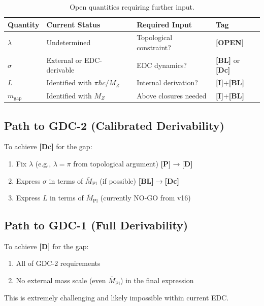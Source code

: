 \documentclass[11pt,a4paper]{article}
\newcommand{\Mpl}{\bar{M}_{\mathrm{Pl}}}
\newcommand{\mgap}{m_{\mathrm{gap}}}
\newcommand{\MZ}{M_Z}
\newcommand{\tagD}{\textbf{[D]}}
\newcommand{\tagDc}{\textbf{[Dc]}}
\newcommand{\tagI}{\textbf{[I]}}
\newcommand{\tagBL}{\textbf{[BL]}}
\newcommand{\tagP}{\textbf{[P]}}
\newcommand{\tagOPEN}{\textbf{[OPEN]}}
\theoremstyle{definition}
\theoremstyle{plain}
\theoremstyle{remark}
\begin{document}
\begin{table}[htbp]
\centering
\caption{Open quantities requiring further input.}
\label{tab:open}
\begin{tabular}{@{}llll@{}}
\toprule
Quantity & Current Status & Required Input & Tag \\
\midrule
$\lambda$ & Undetermined & Topological constraint? & \tagOPEN{} \\
$\sigma$ & External or EDC-derivable & EDC dynamics? & \tagBL{} or \tagDc{} \\
$L$ & Identified with $\pi\hbar c/\MZ$ & Internal derivation? & \tagI{}+\tagBL{} \\
$\mgap$ & Identified with $\MZ$ & Above closures needed & \tagI{}+\tagBL{} \\
\bottomrule
\end{tabular}
\end{table}

\subsection{Path to GDC-2 (Calibrated Derivability)}

To achieve \tagDc{} for the gap:
\begin{enumerate}
\item Fix $\lambda$ (e.g., $\lambda = \pi$ from topological argument) \tagP{}$\to$\tagD{}
\item Express $\sigma$ in terms of $\Mpl$ (if possible) \tagBL{}$\to$\tagDc{}
\item Express $L$ in terms of $\Mpl$ (currently NO-GO from v16)
\end{enumerate}

\subsection{Path to GDC-1 (Full Derivability)}

To achieve \tagD{} for the gap:
\begin{enumerate}
\item All of GDC-2 requirements
\item No external mass scale (even $\Mpl$) in the final expression
\end{enumerate}

This is extremely challenging and likely impossible within current EDC.

\end{document}
